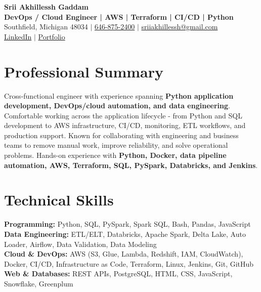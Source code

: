 \documentclass[letterpaper,10pt]{article}
\begin{document}
\fontsize{9.35pt}{10.45pt}\selectfont

\begin{center}
    {\LARGE \textbf{Srii Akhillessh Gaddam}} \\[-1pt]
    \textbf{DevOps / Cloud Engineer | AWS | Terraform | CI/CD | Python} \\[2pt]
    Southfield, Michigan 48034 $|$
    \href{tel:6468752400}{646-875-2400} $|$
    \href{mailto:sriiakhillessh@gmail.com}{sriiakhillessh@gmail.com} \\[1pt]
    \href{https://www.linkedin.com/in/srii-akhiilessh-gaddam-b48668191/}{LinkedIn} $|$
    \href{https://sriiakhillesshg.github.io/portfolio/}{Portfolio}
\end{center}
\vspace{-8pt}

\section{Professional Summary}
\small{Cross-functional engineer with experience spanning \textbf{Python application development, DevOps/cloud automation, and data engineering}. Comfortable working across the application lifecycle - from Python and SQL development to AWS infrastructure, CI/CD, monitoring, ETL workflows, and production support. Known for collaborating with engineering and business teams to remove manual work, improve reliability, and solve operational problems. Hands-on experience with \textbf{Python, Docker, data pipeline automation, AWS, Terraform, SQL, PySpark, Databricks, and Jenkins}.}

\section{Technical Skills}
\small{
\textbf{Programming:} Python, SQL, PySpark, Spark SQL, Bash, Pandas, JavaScript \\
\textbf{Data Engineering:} ETL/ELT, Databricks, Apache Spark, Delta Lake, Auto Loader, Airflow, Data Validation, Data Modeling \\
\textbf{Cloud \& DevOps:} AWS (S3, Glue, Lambda, Redshift, IAM, CloudWatch), Docker, CI/CD, Infrastructure as Code, Terraform, Linux, Jenkins, Git, GitHub \\
\textbf{Web \& Databases:} REST APIs, PostgreSQL, HTML, CSS, JavaScript, Snowflake, Greenplum
}
\end{document}
